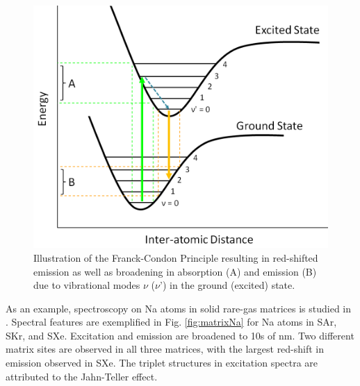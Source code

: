 



\begin{figure} %
        \centering
                \includegraphics[width=.7\textwidth]{figures/FranckCondon.png}
                \caption{Illustration of the Franck-Condon Principle resulting in red-shifted emission as well as broadening in absorption (A) and emission (B) due to vibrational modes $\nu$ ($\nu$') in the ground (excited) state.}
\label{fig:FranckCondon}
\end{figure}

As an example, spectroscopy on Na atoms in solid rare-gas matrices is studied in \cite{matrixNa}.  Spectral features are exemplified in Fig. \ref{fig:matrixNa} for Na atoms in SAr, SKr, and SXe.  Excitation and emission are broadened to 10s of nm.  Two different matrix sites are observed in all three matrices, with the largest red-shift in emission observed in SXe.  The triplet structures in excitation spectra are attributed to the Jahn-Teller effect.

